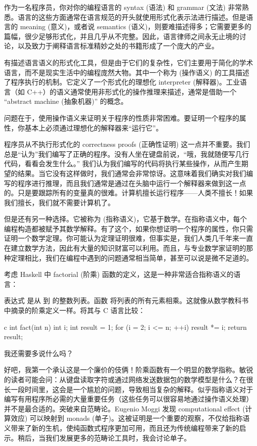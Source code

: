 作为一名程序员，你对你的编程语言的 syntax (语法) 和 grammar (文法) 非常熟悉。语言的这些方面通常在语言规范的开头就使用形式化表示法进行描述。但是语言的 meaning (意义)，或者说 semantics (语义)，则要难描述得多；它需要更多的篇幅，很少足够形式化，并且几乎从不完整。因此，语言律师之间永无止境的讨论，以及致力于阐释语言标准精妙之处的书籍形成了一个庞大的产业。

有描述语言语义的形式化工具，但是由于它们的复杂性，它们主要用于简化的学术语言，而不是现实生活中的编程庞然大物。其中一个称为  (操作语义) 的工具描述了程序执行的机制。它定义了一个形式化的理想化 interpreter (解释器)。工业语言（如 C++）的语义通常使用非形式化的操作推理来描述，通常是借助一个 “abstract machine (抽象机器)” 的概念。

问题在于，使用操作语义来证明关于程序的性质非常困难。要证明一个程序的属性，你基本上必须通过理想化的解释器来“运行它”。

程序员从不执行形式化的 correctness proofs (正确性证明) 这一点并不重要。我们总是“认为”我们编写了正确的程序。没有人坐在键盘前说，“哦，我就随便写几行代码，看看会发生什么。” 我们认为我们编写的代码将执行某些操作，从而产生期望的结果。当它没有这样做时，我们通常会非常惊讶。这意味着我们确实对我们编写的程序进行推理，而且我们通常是通过在头脑中运行一个解释器来做到这一点的。只是要跟踪所有的变量真的很难。计算机擅长运行程序——人类不擅长！如果我们擅长，我们就不需要计算机了。

但是还有另一种选择。它被称为  (指称语义)，它基于数学。在指称语义中，每个编程构造都被赋予其数学解释。有了这个，如果你想证明一个程序的属性，你只需证明一个数学定理。你可能认为定理证明很难，但事实是，我们人类几千年来一直在建立数学方法，因此有大量的知识财富可以利用。而且，与专业数学家证明的那种定理相比，我们在编程中遇到的问题通常相当简单，甚至可以说是微不足道的。

考虑 Haskell 中 factorial (阶乘) 函数的定义，这是一种非常适合指称语义的语言：

表达式 \code{{[}1..n{]}} 是从  到  的整数列表。函数  将列表的所有元素相乘。这就像从数学教科书中摘录的阶乘定义一样。将其与 C 语言比较：

\begin{snip}{c}
int fact(int n) {
    int i;
    int result = 1;
    for (i = 2; i <= n; ++i)
        result *= i;
    return result;
}
\end{snip}
我还需要多说什么吗？

好吧，我第一个承认这是一个廉价的伎俩！阶乘函数有一个明显的数学指称。敏锐的读者可能会问：从键盘读取字符或通过网络发送数据包的数学模型是什么？在很长一段时间里，这会是一个尴尬的问题，导致相当复杂的解释。似乎指称语义对于编写有用程序所必需的大量重要任务（这些任务可以很容易地通过操作语义处理）并不是最合适的。突破来自范畴论。Eugenio Moggi 发现 computational effect (计算效应) 可以映射到 monads (单子)。这被证明是一个重要的观察，不仅给指称语义带来了新的生机，使纯函数式程序更加可用，而且还为传统编程带来了新的启示。稍后，当我们发展更多的范畴论工具时，我会讨论单子。

